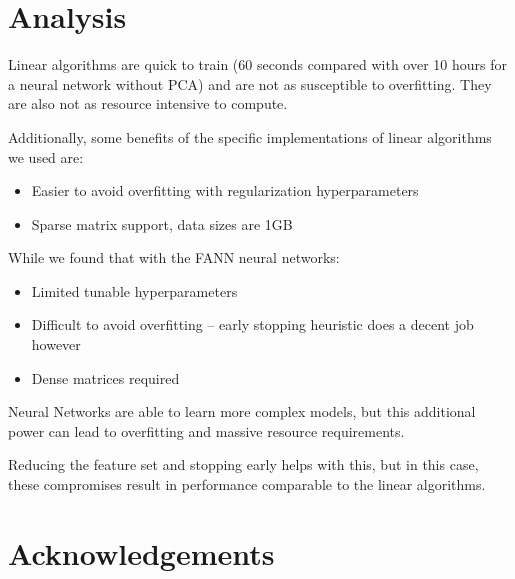 \documentclass[journal]{IEEEtran}
\begin{document}
\section{Analysis}

Linear algorithms are quick to train (60 seconds compared with over 10 hours
for a neural network without PCA) and are not as susceptible to overfitting.
They are also not as resource intensive to compute.

\par Additionally, some benefits of the specific implementations of linear algorithms we used are:
\begin{itemize}
    \item Easier to avoid overfitting with regularization hyperparameters
    \item Sparse matrix support, data sizes are 1GB
\end{itemize}

While we found that with the FANN neural networks:
\begin{itemize}
    \item Limited tunable hyperparameters
    \item Difficult to avoid overfitting -- early stopping heuristic does a decent job however
    \item Dense matrices required
\end{itemize}

\par Neural Networks are able to learn more complex models, but this additional
power can lead to overfitting and massive resource requirements.

\par Reducing the feature set and stopping early helps with this, but in this
case, these compromises result in performance comparable to the linear
algorithms.



\section{Acknowledgements}

\end{document}
